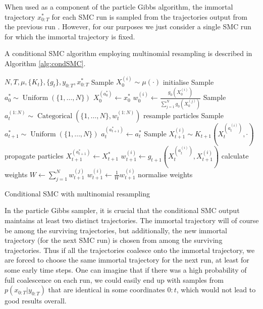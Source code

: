 \documentclass[fleqn]{article}
\theoremstyle{definition}
\newcommand{\Cat}{\operatorname{Categorical}}
\newcommand{\Unif}{\operatorname{Uniform}}
\begin{document}
When used as a component of the particle Gibbs algorithm, the immortal trajectory $x_{0:T}^*$ for each SMC run is sampled from the trajectories output from the previous run \citep[Section 2.4.3]{andrieu2010}. However, for our purposes we just consider a single SMC run for which the immortal trajectory is fixed.

A conditional SMC algorithm employing multinomial resampling is described in Algorithm \ref{alg:condSMC}.

\begin{algorithm}
\begin{algorithmic}[1]
\Require $N, T, \mu, \{K_t\}, \{g_t\}, y_{0:T}, x_{0:T}^*$
	\State Sample $X_0^{(i)} \sim \mu(\cdot)$ \Comment initialise
\EndFor
\State Sample $a_0^* \sim \Unif(\{1,\dots,N\})$
\State $X_0^{(a_0^*)} \gets x_0^*$
	\State $w_0^{(i)} \gets \frac{g_0(X_0^{(i)})}{\sum_{j=1}^N g_0(X_0^{(j)})}$
\EndFor
{}
	\State Sample $a_t^{(1:N)} \sim \Cat(\{1,\dots,N\}, w_t^{(1:N)})$ \Comment resample particles
	\State Sample $a_{t+1}^* \sim \Unif(\{1,\dots,N\})$
	\State $a_t^{(a_{t+1}^*)} \gets a_t^*$
		\State Sample $X_{t+1}^{(i)} \sim K_{t+1}(X_t^{(a_t^{(i)})}, \cdot)$ \Comment propagate particles
	\EndFor
	\State $X_{t+1}^{(a_{t+1}^*)} \gets X_{t+1}^*$
		\State $w_{t+1}^{(i)} \gets g_{t+1}(X_t^{(a_t^{(i)})} , X_{t+1}^{(i)})$ \Comment calculate weights
	\EndFor
	\State $W \gets \sum_{j=1}^N w_{t+1}^{(j)}$
		\State $w_{t+1}^{(i)} \gets \frac{1}{W}w_{t+1}^{(i)}$ \Comment normalise weights
	\EndFor
\EndFor
\end{algorithmic}
\caption{Conditional SMC with multinomial resampling}
\label{alg:condSMC}
\end{algorithm}

In the particle Gibbs sampler, it is crucial that the conditional SMC output maintains at least two distinct trajectories. 
The immortal trajectory will of course be among the surviving trajectories, but additionally, the new immortal trajectory (for the next SMC run) is chosen from among the surviving trajectories.
Thus if all the trajectories coalesce onto the immortal trajectory, we are forced to choose the same immortal trajectory for the next run, at least for some early time steps.
One can imagine that if there was a high probability of full coalescence on each run, we could easily end up with samples from $p(x_{0:T}|y_{0:T})$ that are identical in some coordinates $0:t$, which would not lead to good results overall.
\end{document}
